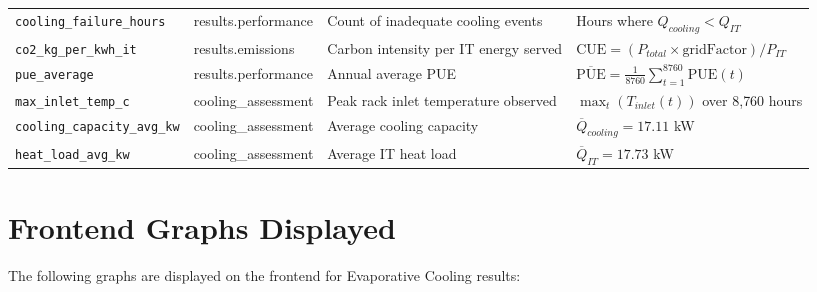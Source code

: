 \documentclass[12pt,a4paper]{report}
\begin{document}
\begin{table}[H]
\begin{tabular}{p{3cm}p{2.5cm}p{4.5cm}p{4.5cm}}
\texttt{cooling\_failure\_hours} & results.performance & Count of inadequate cooling events & Hours where $Q_{cooling} < Q_{IT}$ \\
\texttt{co2\_kg\_per\_kwh\_it} & results.emissions & Carbon intensity per IT energy served & $\text{CUE} = (P_{total} \times \text{gridFactor}) / P_{IT}$ \\
\texttt{pue\_average} & results.performance & Annual average PUE & $\overline{\text{PUE}} = \frac{1}{8760}\sum_{t=1}^{8760}\text{PUE}(t)$ \\
\texttt{max\_inlet\_temp\_c} & cooling\_assessment & Peak rack inlet temperature observed & $\max_{t}(T_{inlet}(t))$ over 8{,}760 hours \\
\texttt{cooling\_capacity\_avg\_kw} & cooling\_assessment & Average cooling capacity & $\overline{Q}_{cooling} = 17.11$ kW \\
\texttt{heat\_load\_avg\_kw} & cooling\_assessment & Average IT heat load & $\overline{Q}_{IT} = 17.73$ kW \\
\bottomrule
\end{tabular}
\end{table}

\section{Frontend Graphs Displayed}

The following graphs are displayed on the frontend for Evaporative Cooling results:
\end{document}
